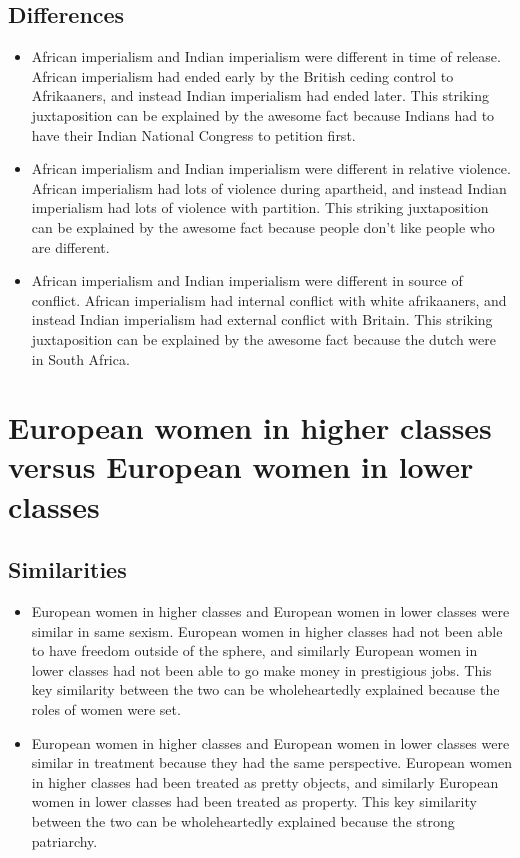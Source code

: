 \documentclass[letterpaper, 10pt]{article}
\begin{document}
            \subsection{Differences}
                \begin{itemize}
                    \item African imperialism and Indian imperialism were different in time of release. African imperialism had ended early by the British ceding control to Afrikaaners, and instead Indian imperialism had ended later. This striking juxtaposition can be explained by the awesome fact because Indians had to have their Indian National Congress to petition first.
                    \item African imperialism and Indian imperialism were different in relative violence. African imperialism had lots of violence during apartheid, and instead Indian imperialism had lots of violence with partition. This striking juxtaposition can be explained by the awesome fact because people don't like people who are different.
                    \item African imperialism and Indian imperialism were different in source of conflict. African imperialism had internal conflict with white afrikaaners, and instead Indian imperialism had external conflict with Britain. This striking juxtaposition can be explained by the awesome fact because the dutch were in South Africa.
                \end{itemize}
        \section{European women in higher classes versus European women in lower classes}
            \subsection{Similarities}
                \begin{itemize}
                    \item European women in higher classes and European women in lower classes were similar in same sexism. European women in higher classes had not been able to have freedom outside of the sphere, and similarly European women in lower classes had not been able to go make money in prestigious jobs. This key similarity between the two can be wholeheartedly explained because the roles of women were set.
                    \item European women in higher classes and European women in lower classes were similar in treatment because they had the same perspective. European women in higher classes had been treated as pretty objects, and similarly European women in lower classes had been treated as property. This key similarity between the two can be wholeheartedly explained because the strong patriarchy.
                \end{itemize}
\end{document}
